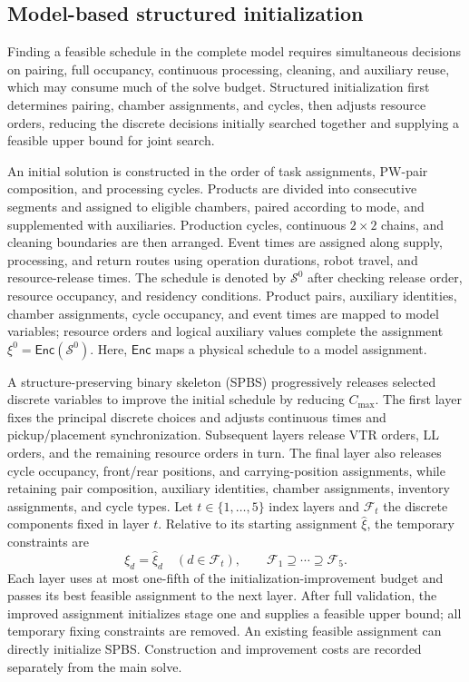 \documentclass[final,5p,times,twocolumn]{elsarticle}
\begin{document}
\subsection{Model-based structured initialization}
\label{sec:pjob-encoding-cn}
Finding a feasible schedule in the complete model requires simultaneous decisions on pairing, full occupancy, continuous processing, cleaning, and auxiliary reuse, which may consume much of the solve budget. Structured initialization first determines pairing, chamber assignments, and cycles, then adjusts resource orders, reducing the discrete decisions initially searched together and supplying a feasible upper bound for joint search.

An initial solution is constructed in the order of task assignments, PW-pair composition, and processing cycles. Products are divided into consecutive segments and assigned to eligible chambers, paired according to mode, and supplemented with auxiliaries. Production cycles, continuous $2\times2$ chains, and cleaning boundaries are then arranged. Event times are assigned along supply, processing, and return routes using operation durations, robot travel, and resource-release times. The schedule is denoted by $\mathcal S^0$ after checking release order, resource occupancy, and residency conditions. Product pairs, auxiliary identities, chamber assignments, cycle occupancy, and event times are mapped to model variables; resource orders and logical auxiliary values complete the assignment $\xi^0=\mathsf{Enc}(\mathcal S^0)$. Here, $\mathsf{Enc}$ maps a physical schedule to a model assignment.

A structure-preserving binary skeleton (SPBS) progressively releases selected discrete variables to improve the initial schedule by reducing $C_{\max}$. The first layer fixes the principal discrete choices and adjusts continuous times and pickup/placement synchronization. Subsequent layers release VTR orders, LL orders, and the remaining resource orders in turn. The final layer also releases cycle occupancy, front/rear positions, and carrying-position assignments, while retaining pair composition, auxiliary identities, chamber assignments, inventory assignments, and cycle types. Let $t\in\{1,\ldots,5\}$ index layers and $\mathcal F_t$ the discrete components fixed in layer $t$. Relative to its starting assignment $\widehat\xi$, the temporary constraints are
\begin{equation}
\xi_d=\widehat\xi_d\quad(d\in\mathcal F_t),\qquad
\mathcal F_1\supseteq\cdots\supseteq\mathcal F_5.
\label{eq:spbs-fix-cn}
\end{equation}
Each layer uses at most one-fifth of the initialization-improvement budget and passes its best feasible assignment to the next layer. After full validation, the improved assignment initializes stage one and supplies a feasible upper bound; all temporary fixing constraints are removed. An existing feasible assignment can directly initialize SPBS. Construction and improvement costs are recorded separately from the main solve.
\end{document}
